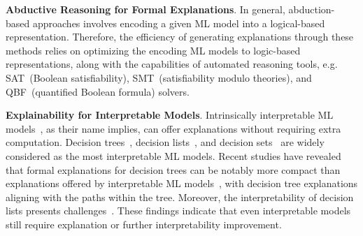 \textbf{Abductive Reasoning for Formal Explanations}.
%
In general, abduction-based approaches involves encoding a given
ML model into a logical-based representation.
%
Therefore, the efficiency of generating explanations through
these methods relies on optimizing the encoding  ML models 
to logic-based representations, along with the capabilities of automated 
reasoning tools, e.g. SAT~(Boolean satisfiability), SMT~(satisfiability modulo theories), 
and QBF~(quantified Boolean formula) solvers.
%

\textbf{Explainability for Interpretable Models}.
%
Intrinsically interpretable ML models~\cite{molnar-bk20,rudin-nmi-19,blrs-ceur22,lzlsr-neurips22,clrsww-dss22,srp-fat22}, 
as their name implies, can offer explanations without requiring extra computation.
%
Decision trees~\cite{rivest-ipl76,breiman-bk84,quinlan-bk93,quinlan-ml86}, 
decision lists~\cite{rudin-mpc18,rivest-ml87}, 
and decision sets~\cite{leskovec-kdd16,michalski-isip69} are widely considered as 
the most interpretable ML models.
%
Recent studies have revealed that formal explanations for decision trees 
can be notably more compact than explanations offered by interpretable ML models~\cite{iims-corr20,iims-jair22},
with decision tree explanations aligning with the paths within the tree.
%
Moreover, the interpretability of decision lists presents challenges~\cite{msi-fai23}. 
%
These findings indicate that even interpretable models still require explanation or 
further interpretability improvement.
